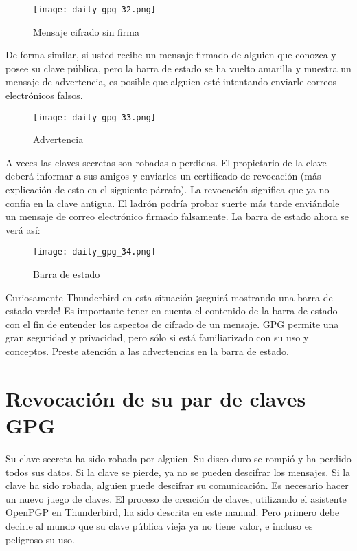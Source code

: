 \documentclass[10pt,a5paper,twoside,,]{book}
\begin{document}
\begin{figure}[htbp]
\centering
\texttt{[image: daily\_gpg\_32.png]}
\caption{Mensaje cifrado sin firma}
\end{figure}

De forma similar, si usted recibe un mensaje firmado de alguien que
conozca y posee su clave pública, pero la barra de estado se ha vuelto
amarilla y muestra un mensaje de advertencia, es posible que alguien
esté intentando enviarle correos electrónicos falsos.

\begin{figure}[htbp]
\centering
\texttt{[image: daily\_gpg\_33.png]}
\caption{Advertencia}
\end{figure}

A veces las claves secretas son robadas o perdidas. El propietario de la
clave deberá informar a sus amigos y enviarles un certificado de
revocación (más explicación de esto en el siguiente párrafo). La
revocación significa que ya no confía en la clave antigua. El ladrón
podría probar suerte más tarde enviándole un mensaje de correo
electrónico firmado falsamente. La barra de estado ahora se verá así:

\begin{figure}[htbp]
\centering
\texttt{[image: daily\_gpg\_34.png]}
\caption{Barra de estado}
\end{figure}

Curiosamente Thunderbird en esta situación ¡seguirá mostrando una barra
de estado verde! Es importante tener en cuenta el contenido de la barra
de estado con el fin de entender los aspectos de cifrado de un mensaje.
GPG permite una gran seguridad y privacidad, pero sólo si está
familiarizado con su uso y conceptos. Preste atención a las advertencias
en la barra de estado.

\section{Revocación de su par de claves
GPG}\label{revocaciuxf3n-de-su-par-de-claves-gpg}

Su clave secreta ha sido robada por alguien. Su disco duro se rompió y
ha perdido todos sus datos. Si la clave se pierde, ya no se pueden
descifrar los mensajes. Si la clave ha sido robada, alguien puede
descifrar su comunicación. Es necesario hacer un nuevo juego de claves.
El proceso de creación de claves, utilizando el asistente OpenPGP en
Thunderbird, ha sido descrita en este manual. Pero primero debe decirle
al mundo que su clave pública vieja ya no tiene valor, e incluso es
peligroso su uso.
\end{document}
